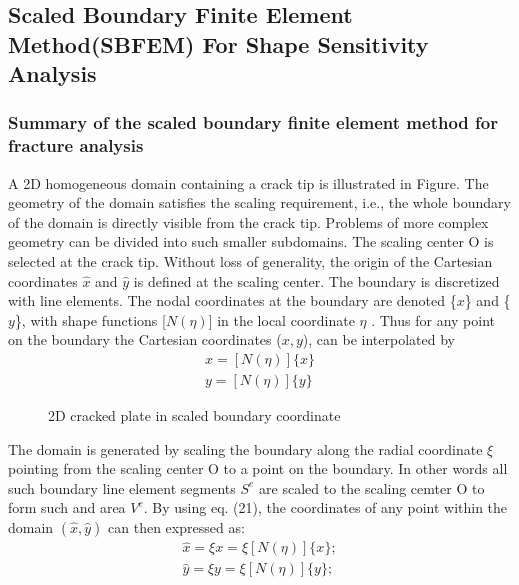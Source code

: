 \documentclass[12pt]{article}
\begin{document}
\subsection{Scaled Boundary Finite Element Method(SBFEM) For Shape Sensitivity Analysis}
\subsubsection{Summary of the scaled boundary finite element method for fracture analysis}A 2D homogeneous domain containing a crack tip is illustrated in Figure. The geometry of the domain satisfies the scaling
requirement, i.e., the whole boundary of the domain is directly visible from the crack tip. Problems of more complex 
geometry can be divided into such smaller subdomains.
The scaling center O is selected at the crack tip.
Without loss of generality, the origin of the Cartesian coordinates $\hat{x}$ and $\hat{y}$
is defined at the scaling center. The boundary is discretized with line elements. The nodal coordinates at the boundary
are denoted \{$x$\} and \{$y$\},
with shape functions [$N( \eta )$] in the local coordinate $\eta$ . Thus for any point on the boundary the Cartesian 
coordinates ($x, y$), can be interpolated by 
\begin{align*}
    x = [N(\eta)]\{x\}\\
    y = [N(\eta)]\{y\} \tag{21} \label{21}
\end{align*}
\begin{figure}[H]
    \centering
    \captionsetup{labelformat=empty}
    \caption{2D cracked plate in scaled boundary coordinate}  
\end{figure}

The domain is generated by scaling the boundary along the radial coordinate $\xi$ 
pointing from the scaling center O to a point
on the boundary. In other words all such boundary line element segments
$S^e$ are scaled to the scaling cemter O to form such and area $V^e$. By using eq. (21), the coordinates of any point within the domain $(\hat{x}, \hat{y})$
can then expressed as:
\begin{align*}
    \hat{x} = \xi x = \xi [N(\eta)]\{x\};\\
    \hat{y} = \xi y = \xi [N(\eta)]\{y\}; \tag{22} \label{22}
\end{align*}
\end{document}
